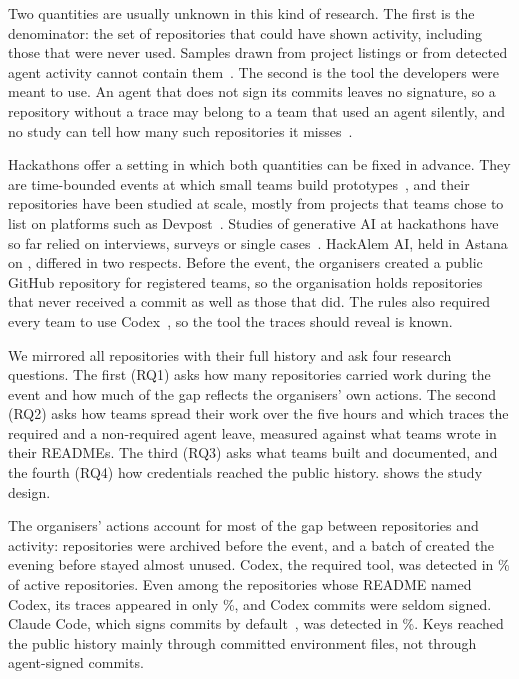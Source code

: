 \documentclass{article}
\begin{document}
Two quantities are usually unknown in this kind of research. The first is the denominator: the set of repositories that could have shown activity, including those that were never used. Samples drawn from project listings or from detected agent activity cannot contain them~\cite{kalliamvakou2014perils,baltes2022sampling}. The second is the tool the developers were meant to use. An agent that does not sign its commits leaves no signature, so a repository without a trace may belong to a team that used an agent silently, and no study can tell how many such repositories it misses~\cite{robbes2026heuristics}.

Hackathons offer a setting in which both quantities can be fixed in advance. They are time-bounded events at which small teams build prototypes~\cite{chau2023hackathons}, and their repositories have been studied at scale, mostly from projects that teams chose to list on platforms such as Devpost~\cite{nolte2020hackathon,mcintosh2021hackathon,imam2021secretlife,mahmoud2022oneoff,halmans2026hackrep}. Studies of generative AI at hackathons have so far relied on interviews, surveys or single cases~\cite{zhou2026quickbuild,gama2025vibes,chen2026codeforall,sajja2024genaihack}. HackAlem AI, held in Astana on \eventdate, differed in two respects. Before the event, the organisers created a public GitHub repository for registered teams, so the organisation holds repositories that never received a commit as well as those that did. The rules also required every team to use Codex~\cite{hackalem2026site}, so the tool the traces should reveal is known.

We mirrored all \NRqOneTotal{} repositories with their full history and ask four research questions. The first (RQ1) asks how many repositories carried work during the event and how much of the gap reflects the organisers' own actions. The second (RQ2) asks how teams spread their work over the five hours and which traces the required and a non-required agent leave, measured against what teams wrote in their READMEs. The third (RQ3) asks what teams built and documented, and the fourth (RQ4) how credentials reached the public history.  shows the study design.

The organisers' actions account for most of the gap between repositories and activity: \NRqOnePrearchivedN{} repositories were archived before the event, and a batch of \NRqOneBatchN{} created the evening before stayed almost unused. Codex, the required tool, was detected in \NRqTwoTracesCodexAnyPct\% of active repositories. Even among the repositories whose README named Codex, its traces appeared in only \NRqTwoTracesSelfReportCodexTraceGivenMentionPct\%, and Codex commits were seldom signed. Claude Code, which signs commits by default~\cite{claudecode2026attribution}, was detected in \NRqTwoTracesClaudeAnyPct\%. Keys reached the public history mainly through committed environment files, not through agent-signed commits.
\end{document}
